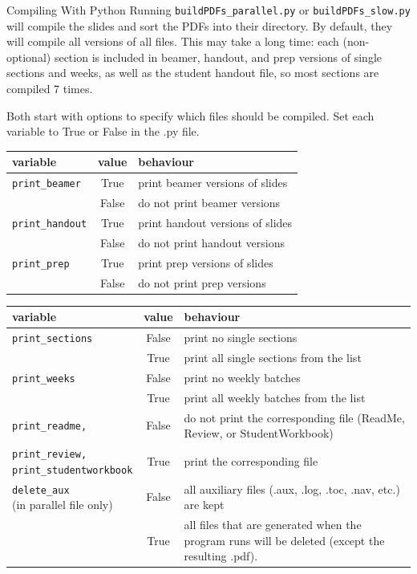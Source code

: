 \documentclass[10pt]{beamer}
\begin{document}
\begin{frame}{Compiling With Python}
Running \texttt{buildPDFs\_parallel.py} or \texttt{buildPDFs\_slow.py} will compile the slides and sort the PDFs into their directory. By default, they will compile all versions of all files. This may take a long time: each (non-optional) section is included in beamer, handout, and prep versions of single sections and weeks, as well as the student handout file, so most sections are compiled 7 times.\vfill

Both start with options to specify which files should be compiled. Set each variable to True or False in the .py file.\vfill
\begin{tabular}{lcl}
\textbf{variable} &\textbf{ value} & \textbf{behaviour}\\\hline
\texttt{print\_beamer} & True & print beamer versions of  slides\\
 & False & do not print beamer versions
\\\hline
\texttt{print\_handout} & True & print handout versions of  slides\\
 & False & do not print handout versions
\\\hline
\texttt{print\_prep} & True & print prep versions of  slides\\
 & False & do not print prep versions
\\\hline
\end{tabular}
\end{frame}

\begin{frame}

\begin{tabular}{lc l}
\textbf{variable} &\textbf{ value} & \textbf{behaviour}\\\hline
\texttt{print\_sections} & False & print no single sections\\
 & True & print all single sections from the list\\
 \hline
\texttt{print\_weeks} & False & print no weekly batches\\
 & True & print all weekly batches from the list\\
 \hline
\texttt{print\_readme,} 
&False & \parbox[t]{0.55\textwidth}{\raggedright do not print the corresponding file (ReadMe, Review, or  StudentWorkbook)}\\
\parbox[t]{0.2\textwidth}{\texttt{print\_review,\\print\_studentworkbook}}
&True & print the corresponding file
\\\hline
\parbox[t]{0.2\textwidth}{\texttt{delete\_aux} \\ (in parallel file only)}& False &  \parbox[t]{0.55\textwidth}{all auxiliary files (.aux, .log, .toc, .nav, etc.) are kept}\\
 & True & \parbox[t]{0.55\textwidth}{all files that are generated when the program runs will be deleted (except the resulting .pdf). }
 \\ \hline
\end{tabular}
\end{frame}
\end{document}
